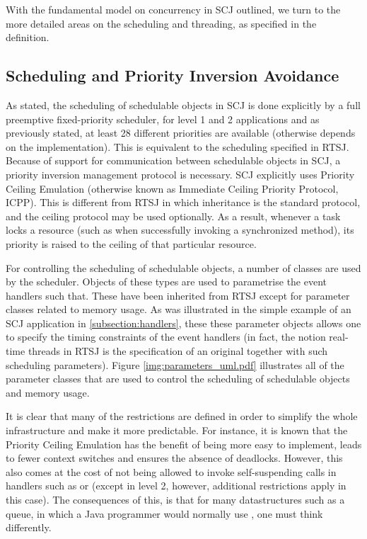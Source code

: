 With the fundamental model on concurrency in SCJ outlined, we turn to the more detailed areas on the scheduling and threading, as specified in the definition.

\subsection{Scheduling and Priority Inversion Avoidance} %
\label{sub:schedulingobjects}
As stated, the scheduling of schedulable objects in SCJ is done explicitly by a full preemptive fixed-priority scheduler, for level 1 and 2 applications and as previously stated, at least 28 different priorities are available (otherwise depends on the implementation). This is equivalent to the scheduling specified in RTSJ. Because of support for communication between schedulable objects in SCJ, a priority inversion management protocol is necessary. SCJ explicitly uses Priority Ceiling Emulation (otherwise known as Immediate Ceiling Priority Protocol, ICPP). This is different from RTSJ in which inheritance is the standard protocol, and the ceiling protocol may be used optionally. As a result, whenever a task locks a resource (such as when successfully invoking a synchronized method), its priority is raised to the ceiling of that particular resource.

For controlling the scheduling of schedulable objects, a number of classes are used by the scheduler. Objects of these types are used to parametrise the event handlers such that. These have been inherited from RTSJ except for parameter classes related to memory usage. As was illustrated in the simple example of an SCJ application in \ref{subsection:handlers}, these these parameter objects allows one to specify the timing constraints of the event handlers (in fact, the notion real-time threads in RTSJ is the specification of an original  together with such scheduling parameters). Figure \ref{img:parameters_uml.pdf} illustrates all of the parameter classes that are used to control the scheduling of schedulable objects and memory usage.

It is clear that many of the restrictions are defined in order to simplify the whole infrastructure and make it more predictable. For instance, it is known that the Priority Ceiling Emulation has the benefit of being more easy to implement, leads to fewer context switches and ensures the absence of deadlocks\cite{alan2001real}. However, this also comes at the cost of not being allowed to invoke self-suspending calls in handlers such as  or  (except in level 2, however, additional restrictions apply in this case). The consequences of this, is that for many datastructures such as a queue, in which a Java programmer would normally use , one must think differently.


